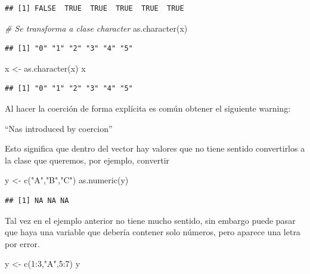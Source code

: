 \documentclass[
  12pt,
]{book}
\newenvironment{Shaded}{\begin{snugshade}}{\end{snugshade}}
\newcommand{\CommentTok}[1]{\textcolor[rgb]{0.56,0.35,0.01}{\textit{#1}}}
\newcommand{\DecValTok}[1]{\textcolor[rgb]{0.00,0.00,0.81}{#1}}
\newcommand{\FunctionTok}[1]{\textcolor[rgb]{0.00,0.00,0.00}{#1}}
\newcommand{\NormalTok}[1]{#1}
\newcommand{\OtherTok}[1]{\textcolor[rgb]{0.56,0.35,0.01}{#1}}
\newcommand{\SpecialCharTok}[1]{\textcolor[rgb]{0.00,0.00,0.00}{#1}}
\newcommand{\StringTok}[1]{\textcolor[rgb]{0.31,0.60,0.02}{#1}}
\begin{document}
\begin{verbatim}
## [1] FALSE  TRUE  TRUE  TRUE  TRUE  TRUE
\end{verbatim}

\begin{Shaded}
\begin{Highlighting}[]
\CommentTok{\# Se transforma a clase character}
\FunctionTok{as.character}\NormalTok{(x)}
\end{Highlighting}
\end{Shaded}

\begin{verbatim}
## [1] "0" "1" "2" "3" "4" "5"
\end{verbatim}

\begin{Shaded}
\begin{Highlighting}[]
\NormalTok{x }\OtherTok{\textless{}{-}} \FunctionTok{as.character}\NormalTok{(x)}
\NormalTok{x}
\end{Highlighting}
\end{Shaded}

\begin{verbatim}
## [1] "0" "1" "2" "3" "4" "5"
\end{verbatim}

Al hacer la coerción de forma explícita es común obtener el siguiente warning:

``Nas introduced by coercion''

Esto significa que dentro del vector hay valores que no tiene sentido convertirlos a la clase que queremos, por ejemplo, convertir

\begin{Shaded}
\begin{Highlighting}[]
\NormalTok{y }\OtherTok{\textless{}{-}} \FunctionTok{c}\NormalTok{(}\StringTok{"A"}\NormalTok{,}\StringTok{"B"}\NormalTok{,}\StringTok{"C"}\NormalTok{)}
\FunctionTok{as.numeric}\NormalTok{(y)}
\end{Highlighting}
\end{Shaded}

\begin{verbatim}
## [1] NA NA NA
\end{verbatim}

Tal vez en el ejemplo anterior no tiene mucho sentido, sin embargo puede pasar que haya una variable que debería contener solo números, pero aparece una letra por error.

\begin{Shaded}
\begin{Highlighting}[]
\NormalTok{y }\OtherTok{\textless{}{-}} \FunctionTok{c}\NormalTok{(}\DecValTok{1}\SpecialCharTok{:}\DecValTok{3}\NormalTok{,}\StringTok{"A"}\NormalTok{,}\DecValTok{5}\SpecialCharTok{:}\DecValTok{7}\NormalTok{)}
\NormalTok{y}
\end{Highlighting}
\end{Shaded}
\end{document}
